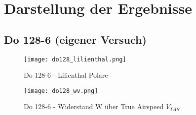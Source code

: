 \chapter{Darstellung der Ergebnisse}
\label{chapter:darstellung}

\section{Do 128-6 (eigener Versuch)}

\vspace{2cm}
\begin{figure}[h]
	\begin{center}
		\texttt{[image: do128\_lilienthal.png]} 
		\caption{Do 128-6 - Lilienthal Polare}
	\end{center}
\end{figure}

\begin{figure}[h]
	\begin{center}
		\texttt{[image: do128\_wv.png]} 
		\caption{Do 128-6 - Widerstand W über True Airspeed $V_{TAS}$}
	\end{center}
\end{figure}

\newpage